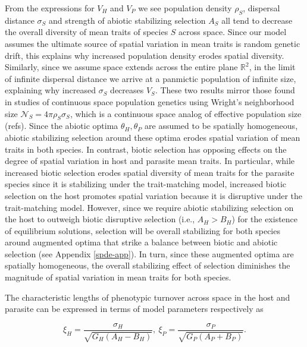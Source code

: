 \documentclass{article}
\begin{document}
From the expressions for \(V_H\) and \(V_P\) we see population density
\(\rho_S\), dispersal distance \(\sigma_S\) and strength of abiotic
stabilizing selection \(A_S\) all tend to decrease the overall diversity
of mean traits of species \(S\) across space. Since our model assumes
the ultimate source of spatial variation in mean traits is random
genetic drift, this explains why increased population density erodes
spatial diversity. Similarly, since we assume space extends across the
entire plane \(\mathbb R^2\), in the limit of infinite dispersal
distance we arrive at a panmictic population of infinite size,
explaining why increased \(\sigma_S\) decreases \(V_S\). These two
results mirror those found in studies of continuous space population
genetics using Wright's neighborhood size
\(\mathscr N_S=4\pi\rho_S\sigma_S\), which is a continuous space analog
of effective population size (refs). Since the abiotic optima
\(\theta_H,\theta_P\) are assumed to be spatially homogeneous, abiotic
stabilizing selection around these optima erodes spatial variation of
mean traits in both species. In contrast, biotic selection has opposing
effects on the degree of spatial variation in host and parasite mean
traits. In particular, while increased biotic selection erodes spatial
diversity of mean traits for the parasite species since it is
stabilizing under the trait-matching model, increased biotic selection
on the host promotes spatial variation because it is disruptive under
the trait-matching model. However, since we require abiotic stabilizing
selection on the host to outweigh biotic disruptive selection (i.e.,
\(A_H>B_H\)) for the existence of equilibrium solutions, selection will
be overall stabilizing for both species around augmented optima that
strike a balance between biotic and abiotic selection (see Appendix
\ref{spde-app}). In turn, since these augmented optima are spatially
homogeneous, the overall stabilizing effect of selection diminishes the
magnitude of spatial variation in mean traits for both species.

The characteristic lengths of phenotypic turnover across space in the
host and parasite can be expressed in terms of model parameters
respectively as

\begin{equation}\label{char-len}
  \xi_H = \frac{\sigma_H}{\sqrt{G_H(A_H-B_H)}}, \ \xi_P = \frac{\sigma_P}{\sqrt{G_P(A_P+B_P)}}.
\end{equation}
\end{document}
